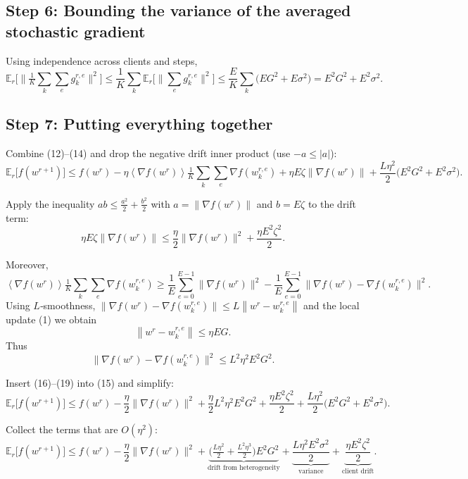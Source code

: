 \documentclass{article}
\newcommand{\EE}{\mathbb{E}}
\newcommand{\norm}[1]{\left\|#1\right\|}
\newcommand{\inner}[1]{\left\langle#1\right\rangle}
\begin{document}
\subsection*{Step 6: Bounding the variance of the averaged stochastic gradient}
Using independence across clients and steps,
\[
\EE_{r}\!\bigl[\bigl\|\tfrac1K\sum_{k}\sum_{e} g_{k}^{r,e}\bigr\|^{2}\bigr]
\le \frac{1}{K}\sum_{k}\EE_{r}\!\bigl[\bigl\|\sum_{e} g_{k}^{r,e}\bigr\|^{2}\bigr]
\le \frac{E}{K}\sum_{k}\bigl(E G^{2}+E\sigma^{2}\bigr)
=E^{2}G^{2}+E^{2}\sigma^{2}.
\tag{14}
\]

\subsection*{Step 7: Putting everything together}
Combine (12)–(14) and drop the negative drift inner product (use $-a\le |a|$):
\[
\EE_{r}\!\bigl[f(w^{r+1})\bigr]
\le f(w^{r})-\eta\inner{\nabla f(w^{r})}{\tfrac1K\sum_{k}\sum_{e}\nabla f(w_{k}^{r,e})}
   +\eta E\zeta\|\nabla f(w^{r})\|
   +\frac{L\eta^{2}}{2}\bigl(E^{2}G^{2}+E^{2}\sigma^{2}\bigr).
\tag{15}
\]

Apply the inequality $ab\le \frac{a^{2}}{2}+\frac{b^{2}}{2}$ with
$a=\|\nabla f(w^{r})\|$ and $b=E\zeta$ to the drift term:
\[
\eta E\zeta\|\nabla f(w^{r})\|
\le \frac{\eta}{2}\|\nabla f(w^{r})\|^{2}+\frac{\eta E^{2}\zeta^{2}}{2}.
\tag{16}
\]

Moreover,
\[
\inner{\nabla f(w^{r})}{\tfrac1K\sum_{k}\sum_{e}\nabla f(w_{k}^{r,e})}
\ge \frac{1}{E}\sum_{e=0}^{E-1}\|\nabla f(w^{r})\|^{2}
      -\frac{1}{E}\sum_{e=0}^{E-1}\|\nabla f(w^{r})-\nabla f(w_{k}^{r,e})\|^{2}.
\tag{17}
\]
Using $L$‑smoothness, $\|\nabla f(w^{r})-\nabla f(w_{k}^{r,e})\|\le L\norm{w^{r}-w_{k}^{r,e}}$ and the local update (1) we obtain
\[
\norm{w^{r}-w_{k}^{r,e}}\le \eta E G .
\tag{18}
\]
Thus
\[
\|\nabla f(w^{r})-\nabla f(w_{k}^{r,e})\|^{2}\le L^{2}\eta^{2}E^{2}G^{2}.
\tag{19}
\]

Insert (16)–(19) into (15) and simplify:
\[
\EE_{r}\!\bigl[f(w^{r+1})\bigr]
\le f(w^{r})-\frac{\eta}{2}\|\nabla f(w^{r})\|^{2}
   +\frac{\eta}{2}L^{2}\eta^{2}E^{2}G^{2}
   +\frac{\eta E^{2}\zeta^{2}}{2}
   +\frac{L\eta^{2}}{2}\bigl(E^{2}G^{2}+E^{2}\sigma^{2}\bigr).
\tag{20}
\]

Collect the terms that are $O(\eta^{2})$:
\[
\EE_{r}\!\bigl[f(w^{r+1})\bigr]
\le f(w^{r})-\frac{\eta}{2}\|\nabla f(w^{r})\|^{2}
   +\underbrace{\bigl( \tfrac{L\eta^{2}}{2}+ \tfrac{L^{2}\eta^{3}}{2}\bigr)E^{2}G^{2}}_{\text{drift from heterogeneity}}
   +\underbrace{\frac{L\eta^{2}E^{2}\sigma^{2}}{2}}_{\text{variance}}
   +\underbrace{\frac{\eta E^{2}\zeta^{2}}{2}}_{\text{client drift}} .
\tag{21}
\]
\end{document}
